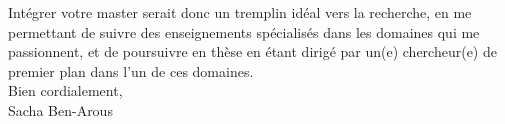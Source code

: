 \documentclass[12pt,a4paper]{article}
\begin{document}
Intégrer votre master serait donc un tremplin idéal vers la recherche, en me permettant de suivre des enseignements spécialisés dans les domaines qui me passionnent, et de poursuivre en thèse en étant dirigé par un(e) chercheur(e) de premier plan dans l’un de ces domaines. \\

\noindent Bien cordialement,\\
Sacha Ben-Arous
\end{document}
